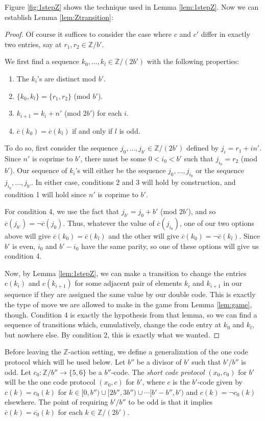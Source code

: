 \documentclass[10pt,a4paper]{article}
\newcommand{\0}{\varnothing}
\newcommand{\Z}{\mathbb{Z}}
\begin{document}
Figure \ref{fig:1stepZ} shows the technique used in Lemma \ref{lem:1stepZ}. Now we can establish Lemma \ref{lem:Ztransition}:

\begin{proof}
Of course it suffices to consider the case where $c$ and $c'$ differ in exactly two entries, say at $r_1,r_2 \in \Z/b'$.

We first find a sequence $k_0,\ldots,k_l \in \Z/(2b')$ with the following properties:
\begin{enumerate}
    \item The $k_i$'s are distinct mod $b'$.
    \item $\{k_0,k_l\} = \{r_1,r_2\}$ (mod $b'$).
    \item $k_{i+1} = k_i + n'$ (mod $2b'$) for each $i$.
    \item $\overline{c}(k_0) = \overline{c}(k_l)$ if and only if $l$ is odd.
\end{enumerate}
To do so, first consider the sequence $j_0,\ldots,j_{b'} \in \Z/(2b')$ defined by $j_i = r_1 + in'$. Since $n'$ is coprime to $b'$, there must be some $0 < i_0 < b'$ such that $j_{i_0} = r_2$ (mod $b'$). Our sequence of $k_i$'s will either be the sequence $j_0,\ldots,j_{i_0}$ or the sequence $j_{i_0},\ldots,j_{b'}$. In either case, conditions $2$ and $3$ will hold by construction, and condition 1 will hold since $n'$ is coprime to $b'$.

For condition 4, we use the fact that $j_{b'} = j_0 + b'$ (mod $2b'$), and so $\overline{c}(j_{b'}) = \neg \overline{c}(j_0)$. Thus, whatever the value of $\overline{c}(j_{i_0})$, one of our two options above will give $\overline{c}(k_0) = \overline{c}(k_l)$ and the other will give $\overline{c}(k_0) = \neg \overline{c}(k_l)$. Since $b'$ is even, $i_0$ and $b'-i_0$ have the same parity, so one of these options will give us condition 4. 

Now, by Lemma \ref{lem:1stepZ}, we can make a transition to change the entries $c(k_i)$ and $c(k_{i+1})$ for some adjacent pair of elements $k_i$ and $k_{i+1}$ in our sequence if they are assigned the same value by our double code. This is exactly the type of move we are allowed to make in the game from Lemma \ref{lem:game}, though. Condition 4 is exactly the hypothesis from that lemma, so we can find a sequence of transitions which, cumulatively, change the code entry at $k_0$ and $k_l$, but nowhere else. By condition 2, this is exactly what we wanted.
\end{proof}

Before leaving the $\Z$-action setting, we define a generalization of the one code protocol which will be used below. Let $b''$ be a divisor of $b'$ such that $b'/b''$ is odd. Let $c_0:\Z/b'' \rightarrow \{5,6\}$ be a $b''$-code. The \textit{short code protocol} $(x_0,c_0)$ for $b'$ will be the one code protocol $(x_0,c)$ for $b'$, where $c$ is the $b'$-code given by $c(k) = c_0(k)$ for $k \in [0,b'') \cup [2b'',3b'') \cup \cdots [b'-b'',b')$ and $c(k) = \neg c_0(k)$ elsewhere. The point of requiring $b'/b''$ to be odd is that it implies $\overline{c}(k) = \overline{c_0}(k)$ for each $k \in \Z/(2b')$.
\end{document}
